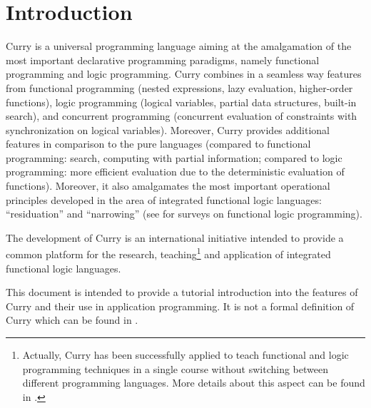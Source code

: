 \chapter{Introduction}

Curry is a universal programming language aiming at the amalgamation
of the most important declarative programming paradigms,
namely functional programming and logic programming.  
Curry combines in a seamless way features from functional programming
(nested expressions, lazy evaluation, higher-order functions),
logic programming (logical variables, partial data structures,
built-in search), and concurrent programming (concurrent evaluation
of constraints with synchronization on logical variables).
Moreover, Curry provides additional features in
comparison to the pure languages (compared to functional programming:
search, computing with partial information; compared to logic
programming: more efficient evaluation due to the deterministic
evaluation of functions).
Moreover, it also amalgamates the most
important operational principles developed in the area of integrated
functional logic languages: ``residuation'' and ``narrowing'' (see
\cite{Hanus94JLP,Hanus07ICLP} for surveys on functional logic programming).

The development of Curry is an international initiative intended to
provide a common platform for the research, teaching\footnote{%
Actually, Curry has been successfully applied to teach functional and
logic programming techniques in a single course without switching
between different programming languages. More details about
this aspect can be found in \cite{Hanus97DPLE}.}
and application of integrated functional logic languages.

This document is intended to provide a tutorial introduction
into the features of Curry and their use in application programming.
It is not a formal definition of Curry which can be found
in \cite{Hanus16Curry}.




